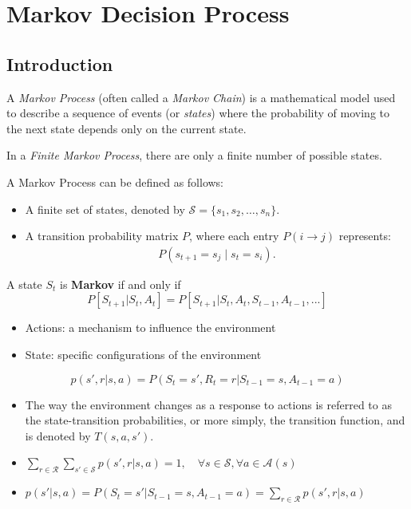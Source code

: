 \chapter{Markov Decision Process}

\section{Introduction}

A \textit{Markov Process} (often called a \textit{Markov Chain}) is a mathematical model used to describe a sequence of events (or \textit{states}) where the probability of moving to the next state depends only on the current state. 

In a \textit{Finite Markov Process}, there are only a finite number of possible states. 

A Markov Process can be defined as follows:
\begin{itemize}
  \item A finite set of states, denoted by \( \mathcal{S} = \{ s_1, s_2, \dots, s_n \} \).
  \item A transition probability matrix \( P \), where each entry \( P(i \to j) \) represents:
	  \begin{align*}
			P(s_{t+1} = s_j \mid s_t = s_i).
	  \end{align*}
\end{itemize}

\begin{definition}
	A state $S_t$ is \textbf{Markov} if and only if 
	$$P[S_{t+1}|S_t, A_t] = P[S_{t+1}|S_t, A_t, S_{t-1},A_{t-1},...]$$
\end{definition}
\begin{itemize}
	\item Actions: a mechanism to influence the environment
	\item State: specific configurations of the environment
\end{itemize}

\begin{definition}
	$$p(s',r|s,a) = P(S_t=s',R_t=r|S_{t-1}=s,A_{t-1}=a)$$
\end{definition}
\begin{itemize}
	\item The way the environment changes as a response to actions is referred to as the state-transition probabilities, or more simply, the transition function, and is denoted by $T(s,a,s')$.
	\item $\sum_{r\in \mathcal{R}}\sum_{s'\in \mathcal{S}}p(s',r|s,a) = 1, \quad \forall s \in \mathcal{S}, \forall a\in \mathcal{A}(s)$
	\item $p(s'|s,a)=P(S_t=s'|S_{t-1}=s,A_{t-1}=a)=\sum_{r\in \mathcal{R}}p(s',r|s,a)$
\end{itemize}

